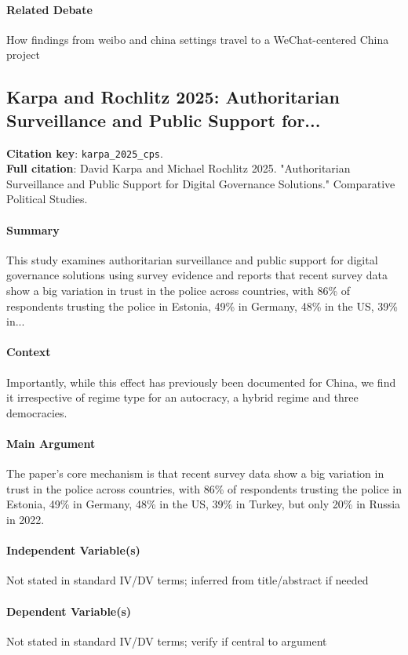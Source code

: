 \documentclass[12pt]{article}
\begin{document}
\paragraph{Related Debate} How findings from weibo and china settings travel to a WeChat-centered China project


\subsection{Karpa and Rochlitz 2025: Authoritarian Surveillance and Public Support for...}
\textbf{Citation key}: \texttt{karpa\_2025\_cps}.\\
\textbf{Full citation}: David Karpa and Michael Rochlitz 2025. "Authoritarian Surveillance and Public Support for Digital Governance Solutions." Comparative Political Studies.

\paragraph{Summary} This study examines authoritarian surveillance and public support for digital governance solutions using survey evidence and reports that recent survey data show a big variation in trust in the police across countries, with 86\% of respondents trusting the police in Estonia, 49\% in Germany, 48\% in the US, 39\% in...

\paragraph{Context} Importantly, while this effect has previously been documented for China, we find it irrespective of regime type for an autocracy, a hybrid regime and three democracies.

\paragraph{Main Argument} The paper's core mechanism is that recent survey data show a big variation in trust in the police across countries, with 86\% of respondents trusting the police in Estonia, 49\% in Germany, 48\% in the US, 39\% in Turkey, but only 20\% in Russia in 2022.

\paragraph{Independent Variable(s)} Not stated in standard IV/DV terms; inferred from title/abstract if needed

\paragraph{Dependent Variable(s)} Not stated in standard IV/DV terms; verify if central to argument
\end{document}

